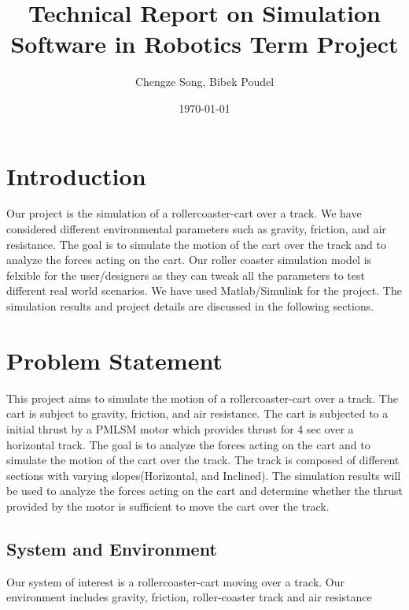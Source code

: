 \documentclass{article}
\title{Technical Report on Simulation Software in Robotics Term Project}
\author{Chengze Song, Bibek Poudel}
\date{\today}
\begin{document}
    \maketitle

    \section{Introduction}
    Our project is the simulation of a rollercoaster-cart over a track. We have considered
    different environmental parameters such as gravity, friction, and air resistance.
    The goal is to simulate the motion of the cart over the track and to analyze
    the forces acting on the cart. Our roller coaster simulation model is felxible
    for the user/designers as they can tweak all the parameters to test different
    real world scenarios. We have used Matlab/Simulink for the project. The simulation
    results and project details are discussed in the following sections.

    \section{Problem Statement}
    This project aims to simulate the motion of a rollercoaster-cart over a track.
    The cart is subject to gravity, friction, and air resistance. The cart is subjected
    to a initial thrust by a PMLSM motor which provides thrust for 4 sec over a horizontal
    track. The goal is to analyze the forces acting on the cart and to simulate
    the motion of the cart over the track. The track is composed of different sections
    with varying slopes(Horizontal, and Inclined). The simulation results will
    be used to analyze the forces acting on the cart and determine whether the
    thrust provided by the motor is sufficient to move the cart over the track.
    \subsection{System and Environment}
    Our system of interest is a rollercoaster-cart moving over a track. Our
    environment includes gravity, friction, roller-coaster track and air
    resistance
\end{document}
